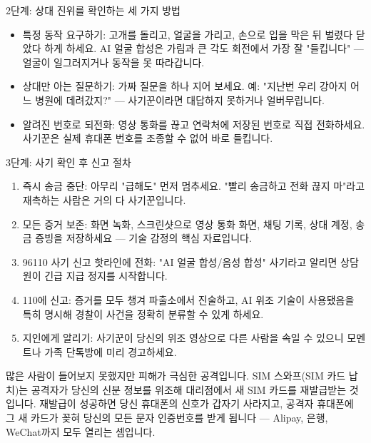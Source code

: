 \begin{tcbinfo}{2단계: 상대 진위를 확인하는 세 가지 방법}
\begin{itemize}
  \item 특정 동작 요구하기: 고개를 돌리고, 얼굴을 가리고, 손으로 입을 막은 뒤 벌렸다 닫았다 하게 하세요. AI 얼굴 합성은 가림과 큰 각도 회전에서 가장 잘 "들킵니다" — 얼굴이 일그러지거나 동작을 못 따라갑니다.
  \item 상대만 아는 질문하기: 가짜 질문을 하나 지어 보세요. 예: "지난번 우리 강아지 어느 병원에 데려갔지?" — 사기꾼이라면 대답하지 못하거나 얼버무립니다.
  \item 알려진 번호로 되전화: 영상 통화를 끊고 연락처에 저장된 번호로 직접 전화하세요. 사기꾼은 실제 휴대폰 번호를 조종할 수 없어 바로 들킵니다.
\end{itemize}

\end{tcbinfo}

\begin{tcbwarn}{3단계: 사기 확인 후 신고 절차}
\begin{enumerate}
  \item 즉시 송금 중단: 아무리 "급해도" 먼저 멈추세요. "빨리 송금하고 전화 끊지 마"라고 재촉하는 사람은 거의 다 사기꾼입니다.
  \item 모든 증거 보존: 화면 녹화, 스크린샷으로 영상 통화 화면, 채팅 기록, 상대 계정, 송금 증빙을 저장하세요 — 기술 감정의 핵심 자료입니다.
  \item 96110 사기 신고 핫라인에 전화: "AI 얼굴 합성/음성 합성" 사기라고 알리면 상담원이 긴급 지급 정지를 시작합니다.
  \item 110에 신고: 증거를 모두 챙겨 파출소에서 진술하고, AI 위조 기술이 사용됐음을 특히 명시해 경찰이 사건을 정확히 분류할 수 있게 하세요.
  \item 지인에게 알리기: 사기꾼이 당신의 위조 영상으로 다른 사람을 속일 수 있으니 모멘트나 가족 단톡방에 미리 경고하세요.
\end{enumerate}

\end{tcbwarn}


많은 사람이 들어보지 못했지만 피해가 극심한 공격입니다. SIM 스와프(SIM 카드 납치)는 공격자가 당신의 신분 정보를 위조해 대리점에서 새 SIM 카드를 재발급받는 것입니다. 재발급이 성공하면 당신 휴대폰의 신호가 갑자기 사라지고, 공격자 휴대폰에 그 새 카드가 꽂혀 당신의 모든 문자 인증번호를 받게 됩니다 — Alipay, 은행, WeChat까지 모두 열리는 셈입니다.

